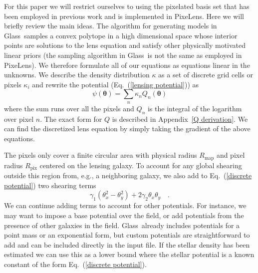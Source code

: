 \documentclass[galley]{mn2e}
\newcommand{\Glass}{{\sc Glass}}
\newcommand{\PixeLens}{{\sc PixeLens}}
\newcommand{\Rmap}{\ensuremath{R_\mathrm{map}}}
\newcommand{\Rpix}{\ensuremath{R_\mathrm{pix}}}
\newcommand{\eqnref}[1] {Eq.~(\ref{#1})}
\newcommand{\appref}[1] {Appendix~\ref{#1}}
\renewcommand{\vec}[1]{\ensuremath{\boldsymbol{#1}}}
\begin{document}
For this paper we will restrict ourselves to using the pixelated basis set that
has been employed in previous work and is implemented in \PixeLens. Here we
will briefly review the main ideas. The algorithm for generating models in
\Glass\ samples a convex polytope in a high dimensional space whose interior
points are solutions to the lens equation and satisfy other physically
motivated linear priors (the sampling algorithm in \Glass\ is not the same as
employed in \PixeLens).  We therefore formulate all of our equations as
equations linear in the unknowns. We describe the density distribution $\kappa$
as a set of discrete grid cells or pixels $\kappa_i$ and rewrite the potential
(\eqnref{lensing potential}) as
%
\begin{equation}
  \psi(\vec\theta) = \sum_n \kappa_n Q_n(\vec\theta)
  \label{discrete potential}
\end{equation}
%
where the sum runs over all the pixels and $Q_n$ is the integral of the logarithm
over pixel $n$. The exact form for $Q$ is described in \appref{Q derivation}.
We can find the discretized lens equation by simply taking the gradient of the
above equations. 

The pixels only cover a finite circular area with physical radius $\Rmap$ and
pixel radius $\Rpix$ centered on the lensing galaxy. To account for any global
shearing outside this region from, e.g., a neighboring galaxy, we also add to
\eqnref{discrete potential} two shearing terms
%
\begin{equation}
\label{shear}
\gamma_1(\theta_x^2 - \theta_y^2) + 2\gamma_2\theta_x\theta_y\quad.
\end{equation}
%
We can continue adding terms to account for other potentials. For instance,
we may want to impose a base potential over the field, or add potentials
from the presence of other galaxies in the field. \Glass\
already includes potentials for a point mass or an exponential form, but custom
potentials are straightforward to add and can be included directly in the input file.
If the stellar density has been estimated we can use this as a lower bound
where the stellar potential is a known constant of the form \eqnref{discrete
potential}.

%
%
\end{document}
